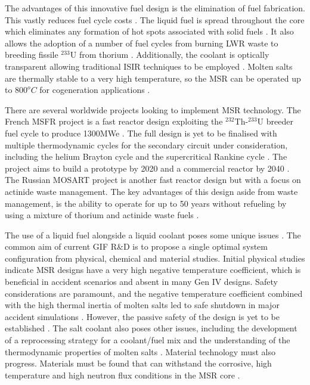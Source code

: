 \documentclass[journal]{IEEEtran}
\begin{document}
The advantages of this innovative fuel design is the elimination of fuel fabrication.
This vastly reduces fuel cycle costs \cite{Locatelli2013}.
The liquid fuel is spread throughout the core which eliminates any formation of hot spots associated with solid fuels \cite{Locatelli2013}.
It also allows the adoption of a number of fuel cycles from burning LWR waste to breeding fissile $^{233}$U from thorium \cite{GenIVForum}.
Additionally, the coolant is optically transparent allowing traditional ISIR techniques to be employed \cite{Bhatnagar2011}.
Molten salts are thermally stable to a very high temperature, so the MSR can be operated up to $800^{o}C$ for cogeneration applications \cite{Marques2010a}. 

There are several worldwide projects looking to implement MSR technology.
The French MSFR project is a fast reactor design exploiting the $^{232}$Th-$^{233}$U breeder fuel cycle \cite{GenIVForum} to produce 1300MWe \cite{Locatelli2013}.
The full design is yet to be finalised with multiple thermodynamic cycles for the secondary circuit under consideration, including the helium Brayton cycle and the supercritical Rankine cycle \cite{Locatelli2013}.
The project aims to build a prototype by 2020 and a commercial reactor by 2040 \cite{Locatelli2013}.
The Russian MOSART project is another fast reactor design but with a focus on actinide waste management. 
The key advantages of this design aside from waste management, is the ability to operate for up to 50 years without refueling by using a mixture of thorium and actinide waste fuels \cite{GenIVForum}.

The use of a liquid fuel alongside a liquid coolant poses some unique issues \cite{Sakamoto2013194}.
The common aim of current GIF R\&D is to propose a single optimal system configuration from physical, chemical and material studies.
Initial physical studies indicate MSR designs have a very high negative temperature coefficient, which is beneficial in accident scenarios and absent in many Gen IV designs.
Safety considerations are paramount, and the negative temperature coefficient combined with the high thermal inertia of molten salts led to safe shutdown in major accident simulations \cite{GenIVForum}.
However, the passive safety of the design is yet to be established \cite{Locatelli2013}.
The salt coolant also poses other issues, including the development of a reprocessing strategy for a coolant/fuel mix and the understanding of the thermodynamic properties of molten salts \cite{GenIVForum}.
Material technology must also progress. 
Materials must be found that can withstand the corrosive, high temperature and high neutron flux conditions in the MSR core \cite{GenIVForum}.
\end{document}
